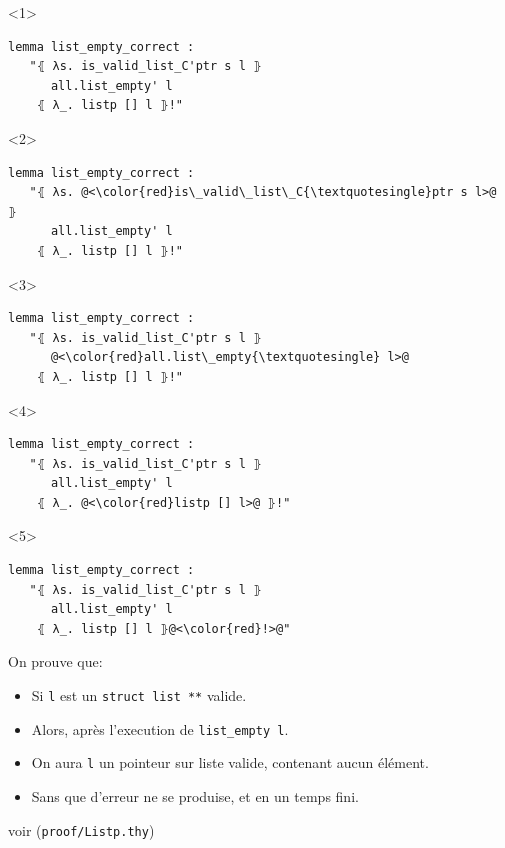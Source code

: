 \documentclass[hyperref={pdfpagelabels=false}]{beamer}
\begin{document}
\begin{frame}[fragile]
  \begin{center}
    \begin{minipage}{0.6\textwidth}
      \begin{onlyenv}<1>
        \begin{lstlisting}
lemma list_empty_correct :
   "⦃ λs. is_valid_list_C'ptr s l ⦄
      all.list_empty' l
    ⦃ λ_. listp [] l ⦄!"
        \end{lstlisting}
  \end{onlyenv}

  \begin{onlyenv}<2>
    \begin{lstlisting}
lemma list_empty_correct :
   "⦃ λs. @<\color{red}is\_valid\_list\_C{\textquotesingle}ptr s l>@ ⦄
      all.list_empty' l
    ⦃ λ_. listp [] l ⦄!"
    \end{lstlisting}
  \end{onlyenv}

  \begin{onlyenv}<3>
    \begin{lstlisting}
lemma list_empty_correct :
   "⦃ λs. is_valid_list_C'ptr s l ⦄
      @<\color{red}all.list\_empty{\textquotesingle} l>@
    ⦃ λ_. listp [] l ⦄!"
    \end{lstlisting}
  \end{onlyenv}

  \begin{onlyenv}<4>
    \begin{lstlisting}
lemma list_empty_correct :
   "⦃ λs. is_valid_list_C'ptr s l ⦄
      all.list_empty' l
    ⦃ λ_. @<\color{red}listp [] l>@ ⦄!"
    \end{lstlisting}
  \end{onlyenv}

  \begin{onlyenv}<5>
    \begin{lstlisting}
lemma list_empty_correct :
   "⦃ λs. is_valid_list_C'ptr s l ⦄
      all.list_empty' l
    ⦃ λ_. listp [] l ⦄@<\color{red}!>@"
    \end{lstlisting}
  \end{onlyenv}
\end{minipage}
  \end{center}

  On prouve que:\\
  \begin{itemize}
    \item<2-> Si \texttt{l} est un \texttt{struct list **} valide.
    \item<3-> Alors, après l'execution de \texttt{list\_empty l}.
    \item<4-> On aura \texttt{l} un pointeur sur liste valide, contenant aucun élément.
    \item<5-> Sans que d'erreur ne se produise, et en un temps fini.
  \end{itemize}

  \vfill
  \hfill
  {\tiny voir (\texttt{proof/Listp.thy})}
\end{frame}
\end{document}
